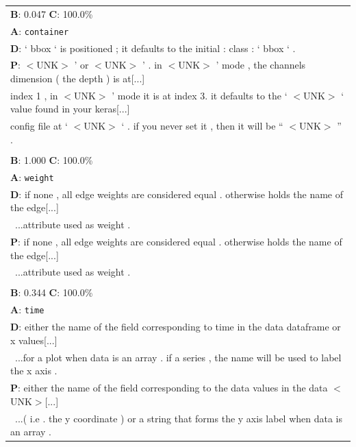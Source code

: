 \begin{table}
\begin{center}
\begin{tabular}{l}
\textbf{B}: 0.047
\textbf{C}: 100.0\%  \\
\textbf{A}: \texttt{container}\\
\textbf{D}: ` bbox ` is positioned ; it defaults to the initial : class : ` bbox ` .\\
\textbf{P}: $<$UNK$>$ ' or $<$UNK$>$ ' . in $<$UNK$>$ ' mode , the channels dimension ( the depth ) is at[...]\\
 index 1 , in $<$UNK$>$ ' mode it is at index 3. it defaults to the ` $<$UNK$>$ ` value found in your keras[...]\\
  config file at ` $<$UNK$>$ ` . if you never set it , then it will be `` $<$UNK$>$ '' . \\
\\
\textbf{B}: 1.000
\textbf{C}: 100.0\%  \\
\textbf{A}: \texttt{weight}\\
\textbf{D}: if none , all edge weights are considered equal . otherwise holds the name of the edge[...]\\\
...attribute used as weight .\\
\textbf{P}: if none , all edge weights are considered equal . otherwise holds the name of the edge[...]\\\
...attribute used as weight . \\
\\
\textbf{B}: 0.344
\textbf{C}: 100.0\%  \\
\textbf{A}: \texttt{time}\\
\textbf{D}: either the name of the field corresponding to time in the data dataframe or x values[...]\\\
...for a plot when data is an array . if a series , the name will be used to label the x axis .\\
\textbf{P}: either the name of the field corresponding to the data values in the data $<$UNK$>$[...]\\\
...( i.e . the y coordinate ) or a string that forms the y axis label when data is an array . \\

\end{tabular}
\end{center}
\end{table}



